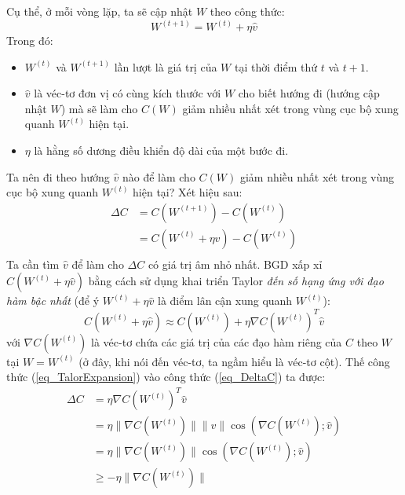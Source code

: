 Cụ thể, ở mỗi vòng lặp, ta sẽ cập nhật $W$ theo công thức:
\begin{equation}
	W^{(t+1)} = W^{(t)} + \eta \hat{v}
\end{equation}
Trong đó:
\begin{itemize}
	\item $W^{(t)}$ và $W^{(t+1)}$ lần lượt là giá trị của $W$ tại thời điểm thứ $t$ và $t+1$.
	\item $\hat{v}$ là véc-tơ đơn vị có cùng kích thước với $W$ cho biết hướng đi (hướng cập nhật $W $) mà sẽ làm cho $C(W)$ giảm nhiều nhất xét trong vùng cục bộ xung quanh $W^{(t)}$ hiện tại.
	\item $\eta$ là hằng số dương điều khiển độ dài của một bước đi.
\end{itemize}
Ta nên đi theo hướng $\hat{v}$ nào để làm cho $C(W)$ giảm nhiều nhất xét trong vùng cục bộ xung quanh $W^{(t)}$ hiện tại? Xét hiệu sau:
\begin{equation}
\begin{split}
	\Delta C &= C(W^{(t+1)}) - C(W^{(t)})\\
			 &= C(W^{(t)} + \eta \hat{v}) - C(W^{(t)})\\	
\end{split}
\label{eq_DeltaC}
\end{equation}
Ta cần tìm $\hat{v}$ để làm cho $\Delta C$ có giá trị âm nhỏ nhất. BGD xấp xỉ $C(W^{(t)} + \eta \hat{v})$ bằng cách sử dụng khai triển Taylor \emph{đến số hạng ứng với đạo hàm bậc nhất} (để ý $W^{(t)} + \eta \hat{v}$ là điểm lân cận xung quanh $W^{(t)}$):
\begin{equation}
	C(W^{(t)} + \eta \hat{v}) \approx C(W^{(t)}) + \eta \nabla C(W^{(t)})^T \hat{v}
	\label{eq_TalorExpansion}
\end{equation}
với $\nabla C(W^{(t)})$ là véc-tơ chứa các giá trị của các đạo hàm riêng của $C$ theo $W$ tại $W=W^{(t)}$ (ở đây, khi nói đến véc-tơ, ta ngầm hiểu là véc-tơ cột). Thế công thức (\ref{eq_TalorExpansion}) vào công thức (\ref{eq_DeltaC}) ta được:
\begin{equation}
\begin{split}
	\Delta C &= \eta \nabla C(W^{(t)})^T \hat{v}\\
			 &= \eta \|\nabla C(W^{(t)})\|\|\hat{v}\|\cos \left(\nabla C(W^{(t)});\hat{v}\right)\\
			 &= \eta \|\nabla C(W^{(t)})\|\cos \left(\nabla C(W^{(t)});\hat{v}\right)\\
			 &\geq - \eta \|\nabla C(W^{(t)})\|
\end{split}
\end{equation}
